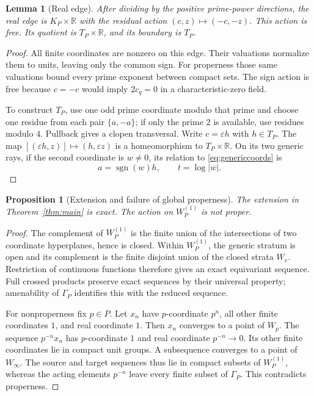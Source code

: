 \documentclass[11pt]{article}
\newcommand{\R}{\mathbb R}
\newcommand{\sgn}{\operatorname{sgn}}
\newtheorem{proposition}[theorem]{Proposition}
\newtheorem{lemma}[theorem]{Lemma}
\theoremstyle{definition}
\theoremstyle{remark}
\begin{document}
\begin{lemma}[Real edge]\label{lem:real}
After dividing by the positive prime-power directions, the real edge is $K_P\times\R$ with the residual action $(c,z)\mapsto(-c,-z)$. This action is free. Its quotient is $T_P\times\R$, and its boundary is $T_P$.
\end{lemma}
\begin{proof}
All finite coordinates are nonzero on this edge. Their valuations normalize them to units, leaving only the common sign. For properness those same valuations bound every prime exponent between compact sets. The sign action is free because $c=-c$ would imply $2c_q=0$ in a characteristic-zero field.

To construct $T_P$, use one odd prime coordinate modulo that prime and choose one residue from each pair $\{a,-a\}$; if only the prime $2$ is available, use residues modulo $4$. Pullback gives a clopen transversal. Write $c=\varepsilon h$ with $h\in T_P$. The map $[(\varepsilon h,z)]\mapsto(h,\varepsilon z)$ is a homeomorphism to $T_P\times\R$. On its two generic rays, if the second coordinate is $w\ne0$, its relation to \eqref{eq:genericcoords} is
\[
 a=\sgn(w)h,\qquad t=\log|w|.
\]
\end{proof}

\begin{proposition}[Extension and failure of global properness]\label{prop:extension}
The extension in Theorem~\ref{thm:main} is exact. The action on $W_P^{(1)}$ is not proper.
\end{proposition}
\begin{proof}
The complement of $W_P^{(1)}$ is the finite union of the intersections of two coordinate hyperplanes, hence is closed. Within $W_P^{(1)}$, the generic stratum is open and its complement is the finite disjoint union of the closed strata $W_v$. Restriction of continuous functions therefore gives an exact equivariant sequence. Full crossed products preserve exact sequences by their universal property; amenability of $\Gamma_P$ identifies this with the reduced sequence.

For nonproperness fix $p\in P$. Let $x_n$ have $p$-coordinate $p^n$, all other finite coordinates $1$, and real coordinate $1$. Then $x_n$ converges to a point of $W_p$. The sequence $p^{-n}x_n$ has $p$-coordinate $1$ and real coordinate $p^{-n}\to0$. Its other finite coordinates lie in compact unit groups. A subsequence converges to a point of $W_\infty$. The source and target sequences thus lie in compact subsets of $W_P^{(1)}$, whereas the acting elements $p^{-n}$ leave every finite subset of $\Gamma_P$. This contradicts properness.
\end{proof}
\end{document}
